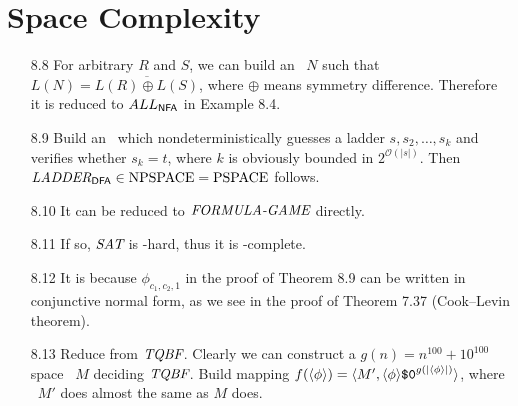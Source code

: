 \section{Space Complexity}

\begin{itemize}
	
	\item[8.8]
	For arbitrary $R$ and $S$, we can build an \NFA\ $N$ such that $L(N) = \overline{L(R) \oplus L(S)}$, where $\oplus$ means symmetry difference. Therefore it is reduced to $ALL_{\textsf{NFA}}$ in Example 8.4.
	
	\item[8.9]
	Build an \NTM\ which nondeterministically guesses a ladder $s, s_2, \dots, s_k$ and verifies whether $s_k = t$, where $k$ is obviously bounded in $2^{\mathcal{O}(|s|)}$. Then $\textit{LADDER}_{\textsf{DFA}} \in \textrm{NPSPACE} = \textrm{PSPACE}$ follows.
	
	\item[8.10]
	It can be reduced to $\textit{FORMULA-GAME}$ directly.
	
	\item[8.11]
	If so, $\textit{SAT}$ is \PSPACE -hard, thus it is \PSPACE -complete.
	
	\item[8.12]
	It is because $\phi_{c_1, c_2, 1}$ in the proof of Theorem 8.9 can be written in conjunctive normal form, as we see in the proof of Theorem 7.37 (Cook--Levin theorem).
	
	\item[8.13]
	Reduce from $\textit{TQBF}$. Clearly we can construct a $g(n) = n^{100}+10^{100}$ space \TM\ $M$ deciding $\textit{TQBF}$. Build mapping $f(\langle {\phi} \rangle) = \langle {M', \langle {\phi} \rangle\texttt{\$0}^{g(|\langle {\phi} \rangle|)}} \rangle$, where \LBA\ $M'$ does almost the same as $M$ does.
	

\end{itemize}
